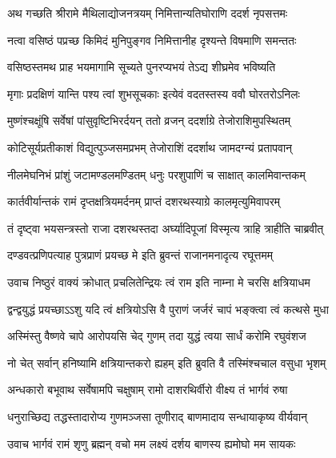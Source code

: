 

\twolineshloka
{अथ गच्छति श्रीरामे मैथिलाद्योजनत्रयम्}
{निमित्तान्यतिघोराणि ददर्श नृपसत्तमः} %

\twolineshloka
{नत्वा वसिष्ठं पप्रच्छ किमिदं मुनिपुङ्गव}
{निमित्तानीह दृश्यन्ते विषमाणि समन्ततः} %

\twolineshloka
{वसिष्ठस्तमथ प्राह भयमागामि सूच्यते}
{पुनरप्यभयं तेऽद्य शीघ्रमेव भविष्यति} %

\twolineshloka
{मृगाः प्रदक्षिणं यान्ति पश्य त्वां शुभसूचकाः}
{इत्येवं वदतस्तस्य ववौ घोरतरोऽनिलः} %

\twolineshloka
{मुष्णंश्चक्षूंषि सर्वेषां पांसुवृष्टिभिरर्दयन्}
{ततो व्रजन् ददर्शाग्रे तेजोराशिमुपस्थितम्} %

\twolineshloka
{कोटिसूर्यप्रतीकाशं विद्युत्पुञ्जसमप्रभम्}
{तेजोराशिं ददर्शाथ जामदग्न्यं प्रतापवान्} %

\twolineshloka
{नीलमेघनिभं प्रांशुं जटामण्डलमण्डितम्}
{धनुः परशुपाणिं च साक्षात् कालमिवान्तकम्} %

\twolineshloka
{कार्तवीर्यान्तकं रामं दृप्तक्षत्रियमर्दनम्}
{प्राप्तं दशरथस्याग्रे कालमृत्युमिवापरम्} %

\twolineshloka
{तं दृष्ट्वा भयसन्त्रस्तो राजा दशरथस्तदा}
{अर्घ्यादिपूजां विस्मृत्य त्राहि त्राहीति चाब्रवीत्} %

\twolineshloka
{दण्डवत्प्रणिपत्याह पुत्रप्राणं प्रयच्छ मे}
{इति ब्रुवन्तं राजानमनादृत्य रघूत्तमम्} %

\twolineshloka
{उवाच निष्ठुरं वाक्यं क्रोधात् प्रचलितेन्द्रियः}
{त्वं राम इति नाम्ना मे चरसि क्षत्रियाधम} %

\twolineshloka
{द्वन्द्वयुद्धं प्रयच्छाऽऽशु यदि त्वं क्षत्रियोऽसि वै}
{पुराणं जर्जरं चापं भङ्क्त्वा त्वं कत्थसे मुधा} %

\twolineshloka
{अस्मिंस्तु वैष्णवे चापे आरोपयसि चेद् गुणम्}
{तदा युद्धं त्वया सार्धं करोमि रघुवंशज} %

\twolineshloka
{नो चेत् सर्वान् हनिष्यामि क्षत्रियान्तकरो ह्यहम्}
{इति ब्रुवति वै तस्मिंश्चचाल वसुधा भृशम्} %

\twolineshloka
{अन्धकारो बभूवाथ सर्वेषामपि चक्षुषाम्}
{रामो दाशरथिर्वीरो वीक्ष्य तं भार्गवं रुषा} %

\twolineshloka
{धनुराच्छिद्य तद्धस्तादारोप्य गुणमञ्जसा}
{तूणीराद् बाणमादाय सन्धायाकृष्य वीर्यवान्} %

\twolineshloka
{उवाच भार्गवं रामं शृणु ब्रह्मन् वचो मम}
{लक्ष्यं दर्शय बाणस्य ह्यमोघो मम सायकः} %

